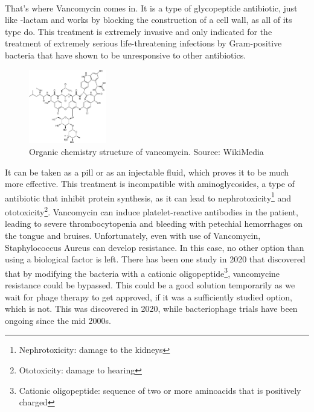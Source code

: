 \paragraph{}That's where Vancomycin comes in. It is a type of glycopeptide antibiotic, just like \beta-lactam and works by blocking the construction of a cell wall, as all of its type do. This treatment is extremely invasive and only indicated for the treatment of extremely serious life-threatening infections by Gram-positive bacteria that have shown to be unresponsive to other antibiotics.\begin{figure}\begin{center}\includegraphics[width=0.30\textwidth]{assets/vancomycin.png}\end{center}\caption{Organic chemistry structure of vancomycin. Source: WikiMedia}\vspace{0.15\linewidth}\end{figure}\newline It can be taken as a pill or as an injectable fluid, which proves it to be much more effective. This treatment is incompatible with aminoglycosides, a type of antibiotic that inhibit protein synthesis, as it can lead to nephrotoxicity\footnote{Nephrotoxicity: damage to the kidneys} and ototoxicity\footnote{Ototoxicity: damage to hearing}. Vancomycin can induce platelet-reactive antibodies in the patient, leading to severe thrombocytopenia and bleeding with petechial hemorrhages on the tongue and bruises. Unfortunately, even with use of Vancomycin, Staphylococcus Aureus can develop resistance. In this case, no other option than using a biological factor is left. There has been one study in 2020 that discovered that by modifying the bacteria with a cationic oligopeptide\footnote{Cationic oligopeptide: sequence of two or more aminoacids that is positively charged}, vancomycine resistance could be bypassed. This could be a good solution temporarily as we wait for phage therapy to get approved, if it was a sufficiently studied option, which is not. This was discovered in 2020, while bacteriophage trials have been ongoing since the mid 2000s.

